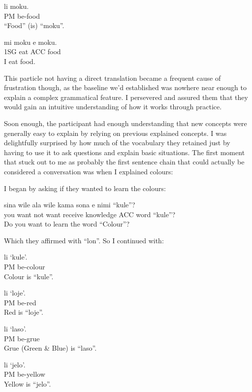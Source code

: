 \documentclass[a4paper,10pt]{article}
\begin{document}
\begin{exe}
 \ex
  li moku. \\
 [Burger; Food] PM be-food \\
 \glt ``Food'' (is) ``moku''.
\end{exe}
\begin{exe}
 \ex
 \gll mi moku e moku. \\
 1SG eat ACC food \\
 \glt I eat food.
\end{exe}

This particle not having a direct translation became a frequent cause of frustration though, as the
baseline we'd established was nowhere near enough to explain a complex grammatical feature. I
persevered and assured them that they would gain an intuitive understanding of how it works through
practice.

Soon enough, the participant had enough understanding that new concepts were generally easy to
explain by relying on previous explained concepts. I was delightfully surprised by how much of the
vocabulary they retained just by having to use it to ask questions and explain basic situations.
The first moment that stuck out to me as probably the first sentence chain that could actually be
considered a conversation was when I explained colours:

I began by asking if they wanted to learn the colours:

\begin{exe}
 \ex
 \gll sina wile ala wile kama sona e nimi ``kule''? \\
 you want not want receive knowledge ACC word ``kule''?\\
 \glt Do you want to learn the word ``Colour''?
\end{exe}

Which they affirmed with ``lon''. So I continued with:

\begin{exe}
 \ex
  li `kule'. \\
 [Image of colour spectrum; Colour] PM be-colour\\
 \glt Colour is ``kule''.
\end{exe}
\begin{exe}
 \ex
  li `loje'. \\
 [Red Circle; Red] PM be-red\\
 \glt Red is ``loje''.
\end{exe}
\begin{exe}
 \ex
  li `laso'. \\
 [Green and Blue Circle; Grue] PM be-grue\\
 \glt Grue (Green \& Blue) is ``laso''.
\end{exe}
\begin{exe}
 \ex
  li `jelo'. \\
 [Yellow Circle; Yellow] PM be-yellow\\
 \glt Yellow is ``jelo''.
\end{exe}
\end{document}
